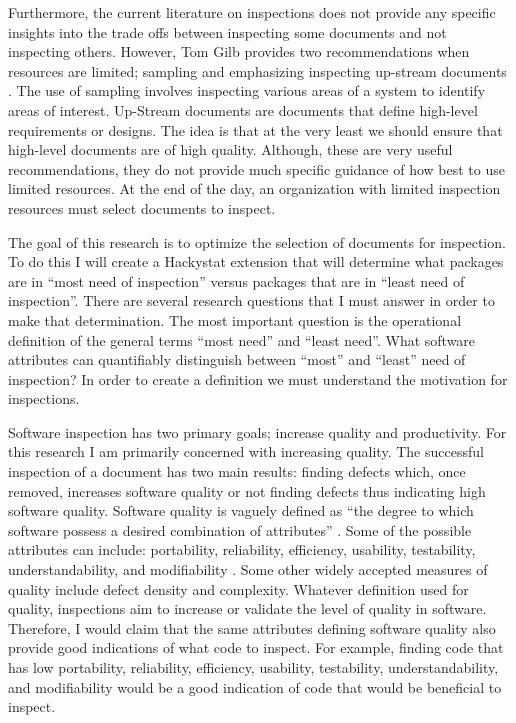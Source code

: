 \documentclass[11pt,twocolumn]{article}
\begin{document}
Furthermore, the current literature \cite{Ebenau94} \cite{Wiegers02}
\cite{Gilb93} on inspections does not provide any specific insights into
the trade offs between inspecting some documents and not inspecting others.
However, Tom Gilb provides two recommendations when resources are limited;
sampling and emphasizing inspecting up-stream documents \cite{Gilb93}. The
use of sampling involves inspecting various areas of a system to identify
areas of interest. Up-Stream documents are documents that define high-level
requirements or designs. The idea is that at the very least we should
ensure that high-level documents are of high quality. Although, these are
very useful recommendations, they do not provide much specific guidance of
how best to use limited resources. At the end of the day, an organization
with limited inspection resources must select documents to inspect. 

The goal of this research is to optimize the selection of documents for
inspection. To do this I will create a Hackystat extension that will
determine what packages are in ``most need of inspection'' versus packages
that are in ``least need of inspection''. There are several research
questions that I must answer in order to make that determination. The most
important question is the operational definition of the general terms
``most need'' and ``least need''. What software attributes can quantifiably
distinguish between ``most'' and ``least'' need of inspection? In order to
create a definition we must understand the motivation for inspections.

Software inspection has two primary goals; increase quality and
productivity. For this research I am primarily concerned with increasing
quality. The successful inspection of a document has two main results:
finding defects which, once removed, increases software quality or not
finding defects thus indicating high software quality. Software quality is
vaguely defined as ``the degree to which software possess a desired
combination of attributes'' \cite{IEEEGlossary83}. Some of the possible
attributes can include: portability, reliability, efficiency, usability,
testability, understandability, and modifiability \cite{Glass03}. Some
other widely accepted measures of quality include defect density and
complexity.  Whatever definition used for quality, inspections aim to
increase or validate the level of quality in software. Therefore, I would
claim that the same attributes defining software quality also provide good
indications of what code to inspect. For example, finding code that has low
portability, reliability, efficiency, usability, testability,
understandability, and modifiability would be a good indication of code
that would be beneficial to inspect.
\end{document}
